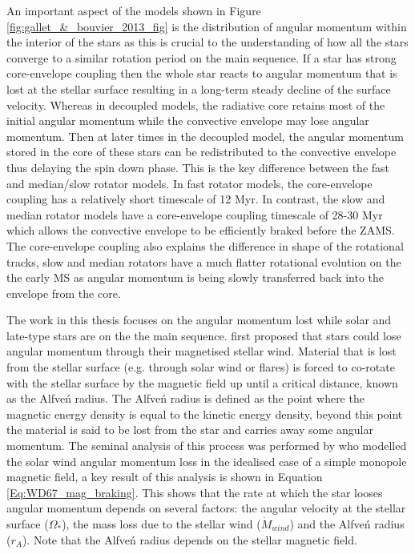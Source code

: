 An important aspect of the models shown in Figure \ref{fig:gallet_&_bouvier_2013_fig} is the distribution of angular momentum within the interior of the stars as this is crucial to the understanding of how all the stars converge to a similar rotation period on the main sequence. If a star has strong core-envelope coupling then the whole star reacts to angular momentum that is lost at the stellar surface resulting in a long-term steady decline of the surface velocity. Whereas in decoupled models, the radiative core retains most of the initial angular momentum while the convective envelope may lose angular momentum. Then at later times in the decoupled model, the angular momentum stored in the core of these stars can be redistributed to the convective envelope thus delaying the spin down phase. This is the key difference between the fast and median/slow rotator models. In fast rotator models, the core-envelope coupling has a relatively short timescale of 12 Myr. In contrast, the slow and median rotator models have a core-envelope coupling timescale of 28-30 Myr which allows the convective envelope to be efficiently braked before the ZAMS. The core-envelope coupling also explains the difference in shape of the rotational tracks, slow and median rotators have a much flatter rotational evolution on the the early MS as angular momentum is being slowly transferred back into the envelope from the core.

The work in this thesis focuses on the angular momentum lost while solar and late-type stars are on the the main sequence. \citet{Schatzman_1962} first proposed that stars could lose angular momentum through their magnetised stellar wind. Material that is lost from the stellar surface (e.g. through solar wind or flares) is forced to co-rotate with the stellar surface by the magnetic field up until a critical distance, known as the Alfve\'n radius. The Alfve\'n radius is defined as the point where the magnetic energy density is equal to the kinetic energy density, beyond this point the material is said to be lost from the star and carries away some angular momentum. The seminal analysis of this process was performed by \citet{Weber_&_Davis_1967} who modelled the solar wind angular momentum loss in the idealised case of a simple monopole magnetic field, a key result of this analysis is shown in Equation \ref{Eq:WD67_mag_braking}. This shows that the rate at which the star looses angular momentum depends on several factors: the angular velocity at the stellar surface ($\Omega_{*}$), the mass loss due to the stellar wind ($\dot{M}_{wind}$) and the Alfve\'n radius ($r_{A}$). Note that the Alfve\'n radius depends on the stellar magnetic field.

